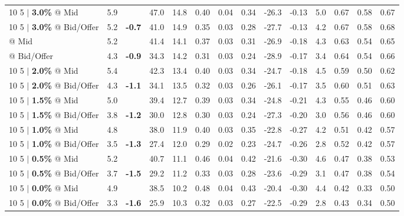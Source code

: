 \documentclass{beamer}
\begin{document}
\begin{frame}
\begin{table}
{\begin{tabular}{lrcrrrrrrrrrrr}
\addlinespace
{10 5 $|$ \bf 3.0\%} @ Mid & 5.9 & & 47.0 & 14.8 & 0.40 & 0.04 & 0.34 & -26.3 & -0.13 & 5.0 & 0.67 & 0.58 & 0.67\\
{10 5 $|$ \bf 3.0\%} @ Bid/Offer & 5.2 & {\bf \color{red}-0.7} & 41.0 & 14.9 & 0.35 & 0.03 & 0.28 & -27.7 & -0.13 & 4.2 & 0.67 & 0.58 & 0.68\\
\addlinespace
\color{blue}{10 5 $|$ \bf 2.5\%} @ Mid & 5.2 & & 41.4 & 14.1 & 0.37 & 0.03 & 0.31 & -26.9 & -0.18 & 4.3 & 0.63 & 0.54 & 0.65\\
\color{blue}{10 5 $|$ \bf 2.5\%} @ Bid/Offer & 4.3 & {\bf \color{red}-0.9} & 34.3 & 14.2 & 0.31 & 0.03 & 0.24 & -28.9 & -0.17 & 3.4 & 0.64 & 0.54 & 0.66\\
\addlinespace
{10 5 $|$ \bf 2.0\%} @ Mid & 5.4 & & 42.3 & 13.4 & 0.40 & 0.03 & 0.34 & -24.7 & -0.18 & 4.5 & 0.59 & 0.50 & 0.62\\
{10 5 $|$ \bf 2.0\%} @ Bid/Offer & 4.3 & {\bf \color{red}-1.1} & 34.1 & 13.5 & 0.32 & 0.03 & 0.26 & -26.1 & -0.17 & 3.5 & 0.60 & 0.51 & 0.63\\
\addlinespace
{10 5 $|$ \bf 1.5\%} @ Mid & 5.0 & & 39.4 & 12.7 & 0.39 & 0.03 & 0.34 & -24.8 & -0.21 & 4.3 & 0.55 & 0.46 & 0.60\\
{10 5 $|$ \bf 1.5\%} @ Bid/Offer & 3.8 & {\bf \color{red}-1.2} & 30.0 & 12.8 & 0.30 & 0.03 & 0.24 & -27.3 & -0.20 & 3.0 & 0.56 & 0.46 & 0.60\\
\addlinespace
{10 5 $|$ \bf 1.0\%} @ Mid & 4.8 & & 38.0 & 11.9 & 0.40 & 0.03 & 0.35 & -22.8 & -0.27 & 4.2 & 0.51 & 0.42 & 0.57\\
{10 5 $|$ \bf 1.0\%} @ Bid/Offer & 3.5 & {\bf \color{red}-1.3} & 27.4 & 12.0 & 0.29 & 0.02 & 0.23 & -24.7 & -0.26 & 2.8 & 0.52 & 0.42 & 0.57\\
\addlinespace
{10 5 $|$ \bf 0.5\%} @ Mid & 5.2 & & 40.7 & 11.1 & 0.46 & 0.04 & 0.42 & -21.6 & -0.30 & 4.6 & 0.47 & 0.38 & 0.53\\
{10 5 $|$ \bf 0.5\%} @ Bid/Offer & 3.7 & {\bf \color{red}-1.5} & 29.2 & 11.2 & 0.33 & 0.03 & 0.28 & -23.6 & -0.29 & 3.1 & 0.47 & 0.38 & 0.54\\
\addlinespace
{10 5 $|$ \bf 0.0\%} @ Mid & 4.9 & & 38.5 & 10.2 & 0.48 & 0.04 & 0.43 & -20.4 & -0.30 & 4.4 & 0.42 & 0.33 & 0.50\\
{10 5 $|$ \bf 0.0\%} @ Bid/Offer & 3.3 & {\bf \color{red}-1.6} & 25.9 & 10.3 & 0.32 & 0.03 & 0.27 & -22.5 & -0.29 & 2.8 & 0.43 & 0.34 & 0.50\\
\bottomrule
\end{tabular}
}
\end{table}
\end{frame}
\end{document}
